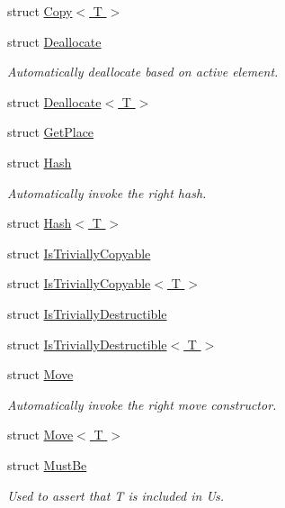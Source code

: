 \begin{DoxyCompactItemize}
struct \hyperlink{structvt_1_1util_1_1adt_1_1detail_1_1_copy_3_01_t_01_4}{Copy$<$ T $>$}
\item 
struct \hyperlink{structvt_1_1util_1_1adt_1_1detail_1_1_deallocate}{Deallocate}
\begin{DoxyCompactList}\small\item\em Automatically deallocate based on active element. \end{DoxyCompactList}\item 
struct \hyperlink{structvt_1_1util_1_1adt_1_1detail_1_1_deallocate_3_01_t_01_4}{Deallocate$<$ T $>$}
\item 
struct \hyperlink{structvt_1_1util_1_1adt_1_1detail_1_1_get_place}{Get\+Place}
\item 
struct \hyperlink{structvt_1_1util_1_1adt_1_1detail_1_1_hash}{Hash}
\begin{DoxyCompactList}\small\item\em Automatically invoke the right hash. \end{DoxyCompactList}\item 
struct \hyperlink{structvt_1_1util_1_1adt_1_1detail_1_1_hash_3_01_t_01_4}{Hash$<$ T $>$}
\item 
struct \hyperlink{structvt_1_1util_1_1adt_1_1detail_1_1_is_trivially_copyable}{Is\+Trivially\+Copyable}
\item 
struct \hyperlink{structvt_1_1util_1_1adt_1_1detail_1_1_is_trivially_copyable_3_01_t_01_4}{Is\+Trivially\+Copyable$<$ T $>$}
\item 
struct \hyperlink{structvt_1_1util_1_1adt_1_1detail_1_1_is_trivially_destructible}{Is\+Trivially\+Destructible}
\item 
struct \hyperlink{structvt_1_1util_1_1adt_1_1detail_1_1_is_trivially_destructible_3_01_t_01_4}{Is\+Trivially\+Destructible$<$ T $>$}
\item 
struct \hyperlink{structvt_1_1util_1_1adt_1_1detail_1_1_move}{Move}
\begin{DoxyCompactList}\small\item\em Automatically invoke the right move constructor. \end{DoxyCompactList}\item 
struct \hyperlink{structvt_1_1util_1_1adt_1_1detail_1_1_move_3_01_t_01_4}{Move$<$ T $>$}
\item 
struct \hyperlink{structvt_1_1util_1_1adt_1_1detail_1_1_must_be}{Must\+Be}
\begin{DoxyCompactList}\small\item\em Used to assert that {\ttfamily T} is included in {\ttfamily Us}. \end{DoxyCompactList}\item 

\end{DoxyCompactItemize}
